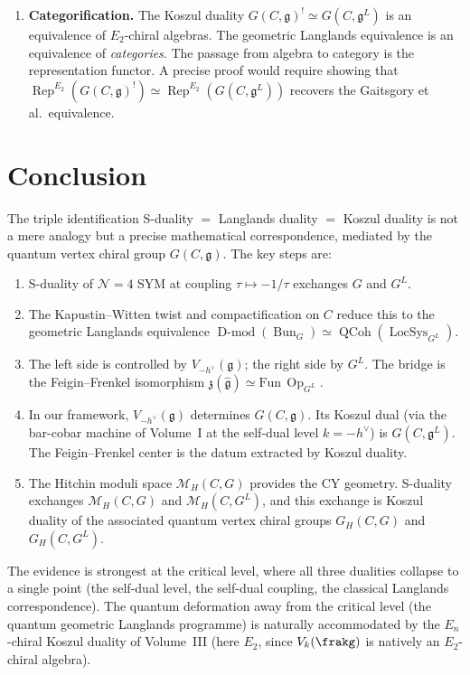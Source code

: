 \documentclass[11pt]{article}
\theoremstyle{definition}
\theoremstyle{remark}
\DeclareMathOperator{\Bun}{Bun}
\DeclareMathOperator{\LocSys}{LocSys}
\DeclareMathOperator{\QCoh}{QCoh}
\DeclareMathOperator{\Dmod}{D\text{-}mod}
\DeclareMathOperator{\Rep}{Rep}
\DeclareMathOperator{\Op}{Op}
\newcommand{\g}{\mathfrak{g}}
\newcommand{\gL}{\mathfrak{g}^L}
\newcommand{\hv}{h^\vee}
\begin{document}
\begin{enumerate}[label=\textbf{Q\arabic*.}]
 \item \textbf{Categorification.} The Koszul duality $G(C,\g)^! \simeq
 G(C,\gL)$ is an equivalence of $E_2$-chiral algebras. The geometric
 Langlands equivalence is an equivalence of \emph{categories}. The passage
 from algebra to category is the representation functor. A precise proof
 would require showing that $\Rep^{E_2}(G(C,\g)^!) \simeq
 \Rep^{E_2}(G(C,\gL))$ recovers the Gaitsgory et al.\ equivalence.
\end{enumerate}


\section{Conclusion}
\label{sec:conclusion}

The triple identification S-duality $=$ Langlands duality $=$ Koszul duality is
not a mere analogy but a precise mathematical correspondence, mediated by the
quantum vertex chiral group $G(C,\g)$. The key steps are:

\begin{enumerate}
 \item S-duality of $\mathcal{N}=4$ SYM at coupling $\tau \mapsto -1/\tau$
 exchanges $G$ and $G^L$.
 \item The Kapustin--Witten twist and compactification on $C$ reduce this to
 the geometric Langlands equivalence
 $\Dmod(\Bun_G) \simeq \QCoh(\LocSys_{G^L})$.
 \item The left side is controlled by $V_{-\hv}(\g)$; the right side by
 $G^L$. The bridge is the Feigin--Frenkel isomorphism
 $\mathfrak{z}(\hat{\g}) \simeq \mathrm{Fun}\,\Op_{G^L}$.
 \item In our framework, $V_{-\hv}(\g)$ determines $G(C,\g)$. Its Koszul
 dual (via the bar-cobar machine of Volume~I at the self-dual level
 $k = -\hv$) is $G(C,\gL)$. The Feigin--Frenkel center is the datum
 extracted by Koszul duality.
 \item The Hitchin moduli space $\mathcal{M}_H(C,G)$ provides the CY
 geometry. S-duality exchanges $\mathcal{M}_H(C,G)$ and
 $\mathcal{M}_H(C,G^L)$, and this exchange is Koszul duality of the
 associated quantum vertex chiral groups $G_H(C,G)$ and $G_H(C,G^L)$.
\end{enumerate}

The evidence is strongest at the critical level, where all three dualities
collapse to a single point (the self-dual level, the self-dual coupling, the
classical Langlands correspondence). The quantum deformation away from the
critical level (the quantum geometric Langlands programme) is naturally
accommodated by the $E_n$-chiral Koszul duality of Volume~III
(here $E_2$, since $V_k(\frakg)$ is natively an $E_2$-chiral algebra).
\end{document}
